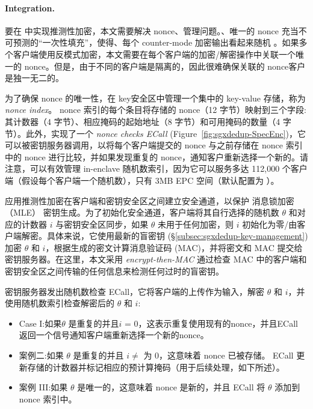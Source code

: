 \paragraph*{Integration.} 要在 \sysnameS 中实现推测性加密，本文需要解决 nonce、管理问题。、唯一的 nonce 充当不可预测的“一次性填充”，使得、每个 counter-mode 加密输出看起来随机 \cite{counter}。如果多个客户端使用反模式加密，本文需要在每个客户端的加密/解密操作中关联一个唯一的 nonce。但是，由于不同的客户端是隔离的，因此很难确保关联的 nonce客户是独一无二的。

为了确保 nonce 的唯一性，\sysnameS 在 key安全区中管理一个集中的 key-value 存储，称为 \textit{ nonce index}。 nonce 索引的每个条目将存储的 nonce（12 字节）映射到三个字段:其计数器（4 字节）、相应掩码的起始地址（8 字节）和可用掩码的数量（4 字节）。此外，\sysnameS 实现了一个 \textit{ nonce checks ECall} (Figure~\ref{fig:sgxdedup-SpecEnc})，它可以被密钥服务器调用，以将每个客户端提交的 nonce 与之前存储在 nonce 索引中的 nonce 进行比较，并如果发现重复的 nonce，通知客户重新选择一个新的。请注意，可以有效管理 in-enclave 随机数索引，因为它可以服务多达 112,000 个客户端（假设每个客户端一个随机数），只有 3MB EPC 空间（默认配置为 \sysnameS）。

\sysnameS 应用推测性加密在客户端和密钥安全区之间建立安全通道，以保护 消息锁加密（MLE） 密钥生成。为了初始化安全通道，客户端将其自行选择的随机数 $\theta$ 和对应的计数器 $i$ 与密钥安全区同步，如果 $\theta$ 未用于任何加密，则 $i$ 初始化为零/由客户端解密。具体来说，它使用最新的盲密钥 (\S\ref{subsec:sgxdedup-key-management}) 加密 $\theta$ 和 $i$，根据生成的密文计算消息验证码 (MAC)，并将密文和 MAC 提交给密钥服务器。在这里，本文采用 \textit{ encrypt-then-MAC} \cite{bellare2000Authenticated} 通过检查 MAC 中的客户端和密钥安全区之间传输的任何信息来检测任何过时的盲密钥。

密钥服务器发出随机数检查 ECall，它将客户端的上传作为输入，解密 $\theta$ 和 $i$，并使用随机数索引检查解密后的 $\theta$ 和 $i$:
%
\begin{itemize}[leftmargin=*]
\item Case I:如果$\theta$ 是重复的并且$i$ = 0，这表示重复使用现有的nonce，并且ECall 返回一个信号通知客户端重新选择一个新的nonce。
\item 案例二:如果 $\theta$ 是重复的并且 $i \neq$ 为 0，这意味着 nonce 已被存储。 ECall 更新存储的计数器并标记相应的预计算掩码（用于后续处理，如下所述）。
\item 案例 III:如果 $\theta$ 是唯一的，这意味着 nonce 是新的，并且 ECall 将 $\theta$ 添加到 nonce 索引中。
\end{itemize}

